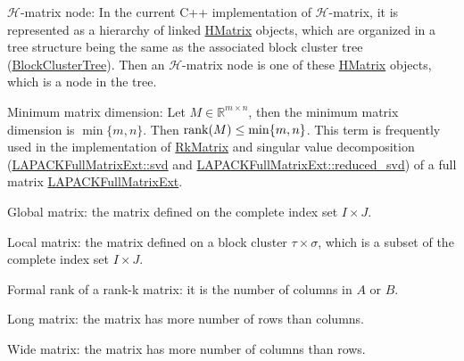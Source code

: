 
\begin{DoxyItemize}
\item $\mathcal{H}$-\/matrix node\+: In the current C++ implementation of $\mathcal{H}$-\/matrix, it is represented as a hierarchy of linked {\ttfamily \hyperlink{classHMatrix}{H\+Matrix}} objects, which are organized in a tree structure being the same as the associated block cluster tree ({\ttfamily \hyperlink{classBlockClusterTree}{Block\+Cluster\+Tree}}). Then an $\mathcal{H}$-\/matrix node is one of these {\ttfamily \hyperlink{classHMatrix}{H\+Matrix}} objects, which is a node in the tree.
\item Minimum matrix dimension\+: Let $M \in \mathbb{R}^{m \times n}$, then the minimum matrix dimension is $\min\{m, n\}$. Then ${\rm rank}(M) \leq \min\{m, n\}$. This term is frequently used in the implementation of {\ttfamily \hyperlink{classRkMatrix}{Rk\+Matrix}} and singular value decomposition ({\ttfamily \hyperlink{classLAPACKFullMatrixExt_a5be14a4d7f9c615f940e870b85d09ecd}{L\+A\+P\+A\+C\+K\+Full\+Matrix\+Ext\+::svd}} and {\ttfamily \hyperlink{classLAPACKFullMatrixExt_a0a6e1d0e88bc84b372b1d0a0f4b79f86}{L\+A\+P\+A\+C\+K\+Full\+Matrix\+Ext\+::reduced\+\_\+svd}}) of a full matrix {\ttfamily \hyperlink{classLAPACKFullMatrixExt}{L\+A\+P\+A\+C\+K\+Full\+Matrix\+Ext}}.
\item Global matrix\+: the matrix defined on the complete index set $I \times J$.
\item Local matrix\+: the matrix defined on a block cluster $\tau \times \sigma$, which is a subset of the complete index set $I \times J$.
\item Formal rank of a rank-\/k matrix\+: it is the number of columns in $A$ or $B$.
\item Long matrix\+: the matrix has more number of rows than columns.
\item Wide matrix\+: the matrix has more number of columns than rows. 
\end{DoxyItemize}